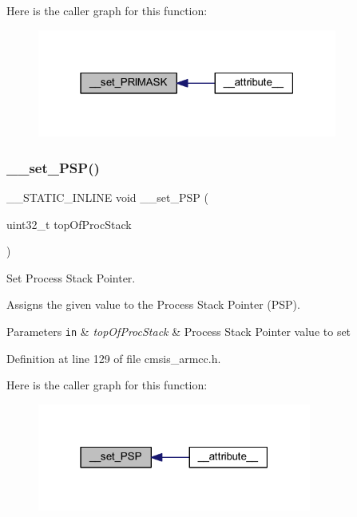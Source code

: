 Here is the caller graph for this function\+:
\nopagebreak
\begin{figure}[H]
\begin{center}
\leavevmode
\includegraphics[width=279pt]{group___c_m_s_i_s___core___reg_acc_functions_ga42e74e3fffe1a2d93db1de04d9260929_icgraph}
\end{center}
\end{figure}
\mbox{\label{group___c_m_s_i_s___core___reg_acc_functions_gab145e35dbaf6868d3a17a8ad360fe379}} 
\subsubsection{\texorpdfstring{\+\_\+\+\_\+set\+\_\+\+P\+S\+P()}{\_\_set\_PSP()}}
{\footnotesize\ttfamily \+\_\+\+\_\+\+S\+T\+A\+T\+I\+C\+\_\+\+I\+N\+L\+I\+NE void \+\_\+\+\_\+set\+\_\+\+P\+SP (\begin{DoxyParamCaption}\item[{uint32\+\_\+t}]{top\+Of\+Proc\+Stack }\end{DoxyParamCaption})}



Set Process Stack Pointer. 

Assigns the given value to the Process Stack Pointer (P\+SP). 
\begin{DoxyParams}[1]{Parameters}
\mbox{\tt in}  & {\em top\+Of\+Proc\+Stack} & Process Stack Pointer value to set \\
\hline
\end{DoxyParams}


Definition at line 129 of file cmsis\+\_\+armcc.\+h.

Here is the caller graph for this function\+:
\nopagebreak
\begin{figure}[H]
\begin{center}
\leavevmode
\includegraphics[width=255pt]{group___c_m_s_i_s___core___reg_acc_functions_gab145e35dbaf6868d3a17a8ad360fe379_icgraph}
\end{center}
\end{figure}
